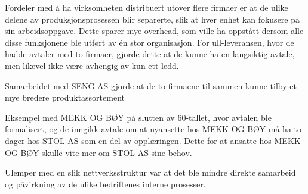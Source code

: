 Fordeler med å ha virksomheten distribuert utover flere firmaer er at de ulike delene av produksjonsprosessen blir separerte, slik at hver enhet kan fokusere på sin arbeidsoppgave.
Dette sparer mye overhead, som ville ha oppstått dersom alle disse funksjonene ble utført av én stor organisasjon.
For ull-leveransen, hvor de hadde avtaler med to firmaer, gjorde dette at de kunne ha en langsiktig avtale, men likevel ikke være avhengig av kun ett ledd.

Samarbeidet med SENG AS gjorde at de to firmaene til sammen kunne tilby et mye bredere produktassortement

Eksempel med MEKK OG BØY på slutten av 60-tallet, hvor avtalen ble formalisert, og de inngikk avtale om at nyansette hos MEKK OG BØY må ha to dager hos STOL AS som en del av opplæringen.
Dette for at ansatte hos MEKK OG BØY skulle vite mer om STOL AS sine behov.

Ulemper med en slik nettverksstruktur var at det ble mindre direkte samarbeid og påvirkning av de ulike bedriftenes interne prosesser.
